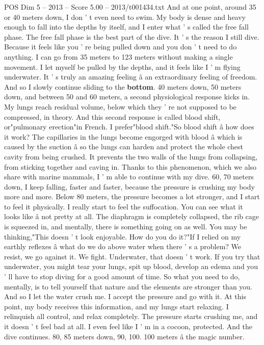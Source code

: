 \begin{textsample}{POS Dim 5 – 2013 – Score 5.00 – 2013/t001434.txt}
And at one point, around 35 or 40 meters down, I don ' t even need to swim.
My body is dense and heavy enough to fall into the depths by itself, and I enter what ' s called the free fall phase.
The free fall phase is the best part of the dive.
It ' s the reason I still dive.
Because it feels like you ' re being pulled down and you don ' t need to do anything.
I can go from 35 meters to 123 meters without making a single movement.
I let myself be pulled by the depths, and it feels like I ' m flying underwater.
It ' s truly an amazing feeling â an extraordinary feeling of freedom.
And so I slowly continue sliding to the \textbf{bottom}. 40 meters down, 50 meters down, and between 50 and 60 meters, a second physiological response kicks in.
My lungs reach residual volume, below which they ' re not supposed to be compressed, in theory.
And this second response is called blood shift, or"pulmonary erection"in French.
I prefer"blood shift."So blood shift â how does it work?
The capillaries in the lungs become engorged with blood â which is caused by the suction â so the lungs can harden and protect the whole chest cavity from being crushed.
It prevents the two walls of the lungs from collapsing, from sticking together and caving in.
Thanks to this phenomenon, which we also share with marine mammals, I ' m able to continue with my dive. 60, 70 meters down, I keep falling, faster and faster, because the pressure is crushing my body more and more.
Below 80 meters, the pressure becomes a lot stronger, and I start to feel it physically.
I really start to feel the suffocation.
You can see what it looks like â not pretty at all.
The diaphragm is completely collapsed, the rib cage is squeezed in, and mentally, there is something going on as well.
You may be thinking,"This doesn ' t look enjoyable.
How do you do it?"If I relied on my earthly reflexes â what do we do above water when there ' s a problem?
We resist, we go against it.
We fight.
Underwater, that doesn ' t work.
If you try that underwater, you might tear your lungs, spit up blood, develop an edema and you ' ll have to stop diving for a good amount of time.
So what you need to do, mentally, is to tell yourself that nature and the elements are stronger than you.
And so I let the water crush me.
I accept the pressure and go with it.
At this point, my body receives this information, and my lungs start relaxing.
I relinquish all control, and relax completely.
The pressure starts crushing me, and it doesn ' t feel bad at all.
I even feel like I ' m in a cocoon, protected.
And the dive continues. 80, 85 meters down, 90, 100. 100 meters â the magic number.

\end{textsample}

